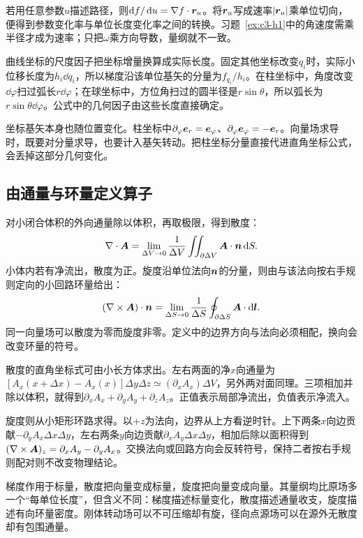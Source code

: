 若用任意参数$u$描述路径，则$\mathop{}\!\mathrm d f/\mathop{}\!\mathrm d u=\nabla f\cdot\bm{r}_u$。将$\bm{r}_u$写成速率$|\bm{r}_u|$乘单位切向，便得到参数变化率与单位长度变化率之间的转换。习题~\ref{ex:c3-h1}中的角速度需乘半径才成为速率；只把$\omega$乘方向导数，量纲就不一致。

曲线坐标的尺度因子把坐标增量换算成实际长度。固定其他坐标改变$q_i$时，实际小位移长度为$h_i\dd q_i$，所以梯度沿该单位基矢的分量为$f_{q_i}/h_i$。在柱坐标中，角度改变$\dd\varphi$扫过弧长$r\dd\varphi$；在球坐标中，方位角扫过的圆半径是$r\sin\theta$，所以弧长为$r\sin\theta\dd\varphi$。公式中的几何因子由这些长度直接确定。

坐标基矢本身也随位置变化。柱坐标中$\partial_\varphi\bm{e}_r=\bm{e}_\varphi$、$\partial_\varphi\bm{e}_\varphi=-\bm{e}_r$。向量场求导时，既要对分量求导，也要计入基矢转动。把柱坐标分量直接代进直角坐标公式，会丢掉这部分几何变化。

\subsection{由通量与环量定义算子}
对小闭合体积的外向通量除以体积，再取极限，得到散度：
\[\nabla\cdot\bm{A}=\lim_{\Delta V\to0}\frac1{\Delta V}\iint_{\partial\Delta V}\bm{A}\cdot\bm{n}\mathop{}\!\mathrm d S.
\]
小体内若有净流出，散度为正。旋度沿单位法向$\bm{n}$的分量，则由与该法向按右手规则定向的小回路环量给出：
\[(\nabla\times\bm{A})\cdot\bm{n}
=\lim_{\Delta S\to0}\frac1{\Delta S}\oint_{\partial\Delta S}\bm{A}\cdot\mathop{}\!\mathrm d\bm{l}.
\]
同一向量场可以散度为零而旋度非零。定义中的边界方向与法向必须相配，换向会改变环量的符号。

散度的直角坐标式可由小长方体求出。左右两面的净$x$向通量为$[A_x(x+\Delta x)-A_x(x)]\Delta y\Delta z\simeq(\partial_xA_x)\Delta V$，另外两对面同理。三项相加并除以体积，就得到$\partial_xA_x+\partial_yA_y+\partial_zA_z$。正值表示局部净流出，负值表示净流入。

旋度则从小矩形环路求得。以$+z$为法向，边界从上方看逆时针。上下两条$x$向边贡献$-\partial_yA_x\Delta x\Delta y$，左右两条$y$向边贡献$\partial_xA_y\Delta x\Delta y$，相加后除以面积得到$(\nabla\times\bm{A})_z=\partial_xA_y-\partial_yA_x$。交换法向或回路方向会反转符号，保持二者按右手规则配对则不改变物理结论。

梯度作用于标量，散度把向量变成标量，旋度把向量变成向量。其量纲均比原场多一个“每单位长度”，但含义不同：梯度描述标量变化，散度描述通量收支，旋度描述有向环量密度。刚体转动场可以不可压缩却有旋，径向点源场可以在源外无散度却有包围通量。

